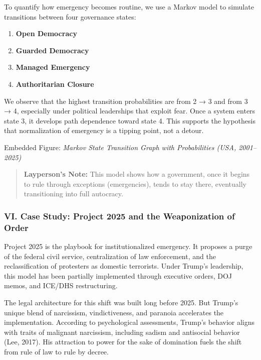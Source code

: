 \documentclass[
]{article}
\providecommand{\tightlist}{%
  \setlength{\itemsep}{0pt}\setlength{\parskip}{0pt}}
\begin{document}
To quantify how emergency becomes routine, we use a Markov model to simulate transitions between four governance states:

\begin{enumerate}
\def\labelenumi{\arabic{enumi}.}
\tightlist
\item
  \textbf{Open Democracy}
\item
  \textbf{Guarded Democracy}
\item
  \textbf{Managed Emergency}
\item
  \textbf{Authoritarian Closure}
\end{enumerate}

We observe that the highest transition probabilities are from 2 → 3 and from 3 → 4, especially under political leaderships that exploit fear. Once a system enters state 3, it develops path dependence toward state 4. This supports the hypothesis that normalization of emergency is a tipping point, not a detour.

Embedded Figure: \emph{Markov State Transition Graph with Probabilities (USA, 2001--2025)}

\begin{quote}
\textbf{Layperson's Note:} This model shows how a government, once it begins to rule through exceptions (emergencies), tends to stay there, eventually transitioning into full autocracy.
\end{quote}

\subsubsection{VI. Case Study: Project 2025 and the Weaponization of Order}\label{vi.-case-study-project-2025-and-the-weaponization-of-order}

Project 2025 is the playbook for institutionalized emergency. It proposes a purge of the federal civil service, centralization of law enforcement, and the reclassification of protesters as domestic terrorists. Under Trump's leadership, this model has been partially implemented through executive orders, DOJ memos, and ICE/DHS restructuring.

The legal architecture for this shift was built long before 2025. But Trump's unique blend of narcissism, vindictiveness, and paranoia accelerates the implementation. According to psychological assessments, Trump's behavior aligns with traits of malignant narcissism, including sadism and antisocial behavior (Lee, 2017). His attraction to power for the sake of domination fuels the shift from rule of law to rule by decree.
\end{document}
